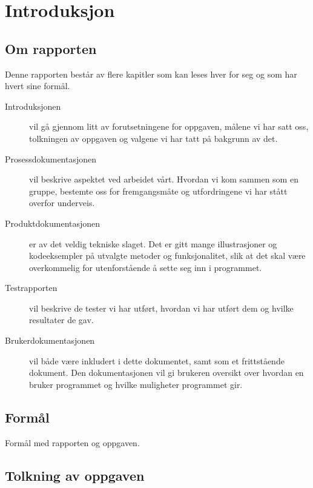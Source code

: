 \chapter{Introduksjon}

\section{Om rapporten}
Denne rapporten består av flere kapitler som kan leses hver for seg og som har hvert sine formål.


\begin{description}

\item[Introduksjonen] vil gå gjennom litt av forutsetningene for oppgaven, målene vi har satt oss, tolkningen av oppgaven og valgene vi har tatt på bakgrunn av det. 

\item[Prosessdokumentasjonen] vil beskrive aspektet ved arbeidet vårt. Hvordan vi kom sammen som en gruppe, bestemte oss for fremgangsmåte og utfordringene vi har stått overfor underveis.

\item[Produktdokumentasjonen] er av det veldig tekniske slaget. Det er gitt mange illustrasjoner og kodeeksempler på utvalgte metoder og funksjonalitet, slik at det skal være overkommelig for utenforstående å sette seg inn i programmet.

\item[Testrapporten] vil beskrive de tester vi har utført, hvordan vi har utført dem og hvilke resultater de gav. 

\item[Brukerdokumentasjonen] vil både være inkludert i dette dokumentet, samt som et frittstående dokument. Den dokumentasjonen vil gi brukeren oversikt over hvordan en bruker programmet og hvilke muligheter programmet gir.

\end{description}

\section{Formål}
Formål med rapporten og oppgaven. 

\section{Tolkning av oppgaven}

